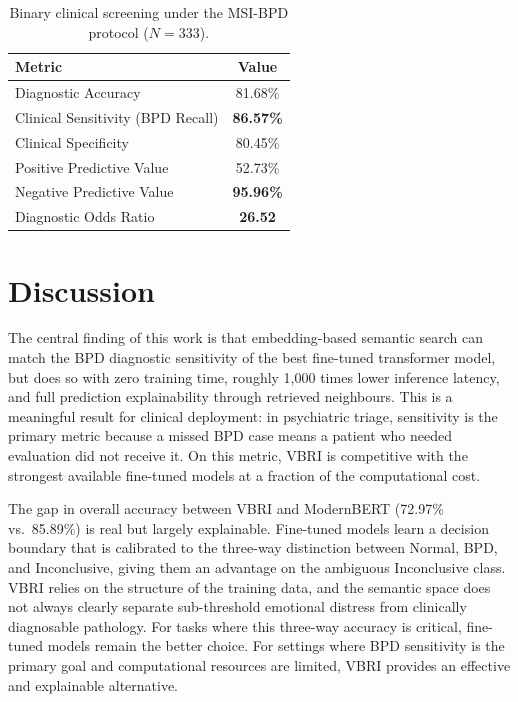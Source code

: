 \documentclass[11pt]{article}
\newcommand{\vbri}{VBRI}
\begin{document}
\begin{table}[H]
\centering
\caption{Binary clinical screening under the MSI-BPD protocol ($N = 333$).}
\label{tab:screening}
\small
\begin{tabular}{@{}lc@{}}
\toprule
\textbf{Metric} & \textbf{Value} \\
\midrule
Diagnostic Accuracy               & 81.68\% \\
Clinical Sensitivity (BPD Recall) & \textbf{86.57\%} \\
Clinical Specificity              & 80.45\% \\
Positive Predictive Value         & 52.73\% \\
Negative Predictive Value         & \textbf{95.96\%} \\
Diagnostic Odds Ratio             & \textbf{26.52} \\
\bottomrule
\end{tabular}
\end{table}

\section{Discussion}\label{sec:discussion}

The central finding of this work is that embedding-based semantic search can match the BPD
diagnostic sensitivity of the best fine-tuned transformer model, but does so with zero training
time, roughly 1,000 times lower inference latency, and full prediction explainability through
retrieved neighbours. This is a meaningful result for clinical deployment: in psychiatric triage,
sensitivity is the primary metric because a missed BPD case means a patient who needed
evaluation did not receive it. On this metric, \vbri{} is competitive with the strongest
available fine-tuned models at a fraction of the computational cost.

The gap in overall accuracy between \vbri{} and ModernBERT (72.97\% vs.\ 85.89\%) is real but
largely explainable. Fine-tuned models learn a decision boundary that is calibrated to the
three-way distinction between Normal, BPD, and Inconclusive, giving them an advantage on the
ambiguous Inconclusive class. \vbri{} relies on the structure of the training data, and the
semantic space does not always clearly separate sub-threshold emotional distress from clinically
diagnosable pathology. For tasks where this three-way accuracy is critical, fine-tuned models
remain the better choice. For settings where BPD sensitivity is the primary goal and
computational resources are limited, \vbri{} provides an effective and explainable alternative.
\end{document}
